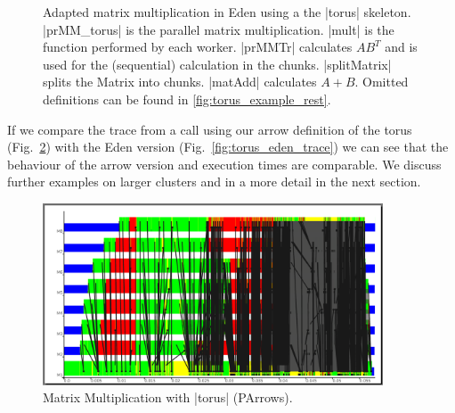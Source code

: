 \begin{figure}[tb]
\caption{Adapted matrix multiplication in Eden using a the |torus| skeleton. |prMM_torus| is the parallel matrix multiplication. |mult| is the function performed by each worker. |prMMTr| calculates $AB^T$ and is used for the (sequential) calculation in the chunks. |splitMatrix| splits the Matrix into chunks. |matAdd| calculates $A + B$. Omitted definitions can be found in \ref{fig:torus_example_rest}. }
\label{fig:torusMatMult}
\end{figure}
If we compare the trace from a call using our arrow definition of the torus (Fig.~\ref{fig:torus_parrows_trace}) with the Eden version (Fig.~\ref{fig:torus_eden_trace}) we can see that the behaviour of the arrow version and execution times are comparable. We discuss further examples on larger clusters and in a more detail in the next section.
\begin{figure}[tb]
	\centering
	\includegraphics[width=0.9\textwidth]{images/torus_matrix_parrows_scale}
	\caption[Matrix Multiplication with |torus| (Parrows)]{Matrix Multiplication with |torus| (PArrows).}
	\label{fig:torus_parrows_trace}
\end{figure}

